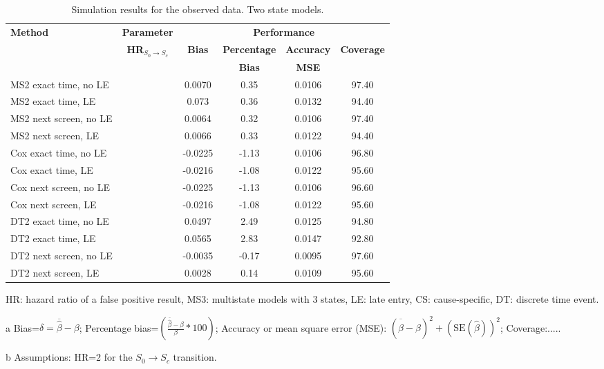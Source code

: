 \begin{table}[h!]
\footnotesize
\centering
\begin{threeparttable}
\begin{tabular}{l|c|c|c|c|c}
\toprule
\textbf{Method} & \textbf{Parameter} &\multicolumn{4}{c}{\textbf{Performance}\tnote{a,b}} \\ \cline{3-6}
&   \textbf{HR$_{S_0 \rightarrow S_c}$} & \textbf{Bias} & \textbf{Percentage} & \textbf{Accuracy}  &  \textbf{Coverage}  \\
& & & \textbf{Bias} &   \textbf{MSE}\\
\midrule
MS2 exact time, no LE&   & 0.0070&0.35&0.0106	&97.40\\
\cmidrule{1-6}
MS2 exact time, LE&  &0.073&	0.36&	0.0132&	94.40\\
\cmidrule{1-6}
MS2 next screen, no LE & & 0.0064&	0.32	&0.0106&97.40\\
\cmidrule{1-6}
MS2 next screen, LE&  &0.0066 &0.33 &0.0122&	94.40\\
\midrule
Cox exact time, no LE&  &-0.0225&	-1.13&	0.0106&	96.80\\
\cmidrule{1-6}
Cox exact time, LE&  & -0.0216&	-1.08&	0.0122&	95.60\\
\cmidrule{1-6}
Cox next screen, no LE&  &-0.0225&	-1.13&	0.0106&	96.60\\
\cmidrule{1-6}
Cox next screen, LE&  &-0.0216&	-1.08&	0.0122&	95.60\\
\midrule
DT2 exact time, no LE & &0.0497&	2.49&	0.0125	&94.80\\
\cmidrule{1-6}
DT2 exact time, LE&  &0.0565	&2.83 &	0.0147	&92.80\\
\cmidrule{1-6}
DT2 next screen, no LE&  &-0.0035 &-0.17 &0.0095 &97.60\\
\cmidrule{1-6}
DT2 next screen, LE& & 0.0028	&0.14	&0.0109	&95.60\\
\bottomrule
\end{tabular}
\begin{tablenotes}\scriptsize
	\item HR: hazard ratio of a false positive result, MS3: multistate models with 3 states, LE: late entry, CS: cause-specific, DT: discrete time event.
	\item[a] Bias=$\delta=\overline{\hat\beta}-\beta$; Percentage bias=$\left(\frac{\overline{\hat\beta}-\beta}{\beta}*100 \right)$; Accuracy or mean square error (MSE): $(\overline{\hat\beta}-\beta)^2+(\mbox{SE}(\hat \beta))^2$; 	 Coverage:..... 
	\item[b] Assumptions: HR=2 for the $S_0 \rightarrow S_c$ transition.
\end{tablenotes}
\end{threeparttable}
\caption{Simulation results for the observed data. Two state models.}
\label{tab:HRFP_observed2}
\end{table}


